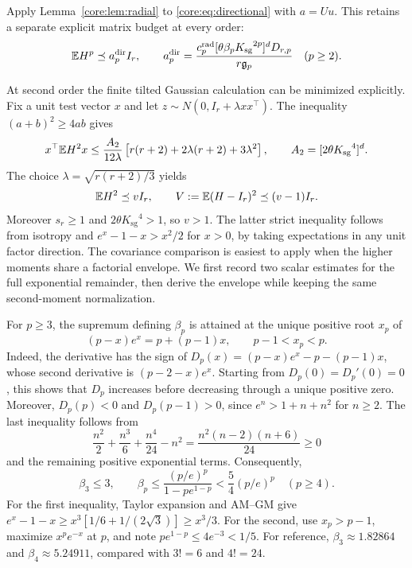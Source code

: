 \documentclass[11pt,a4paper]{article}
\theoremstyle{definition}\newtheorem{definition}[theorem]{Definition}
\theoremstyle{remark}\newtheorem{remark}[theorem]{Remark}
\numberwithin{equation}{section}
\newcommand{\Ksg}{{K_{\mathrm{sg}}}}\newcommand{\Cfour}{{C_4}}
\newcommand{\gmom}{\mathfrak g}
\begin{document}
Apply Lemma~\ref{core:lem:radial}
to \eqref{core:eq:directional} with $a=Uu$. This retains a separate
explicit matrix budget at every order:
\begin{equation}\label{core:eq:direct-budget}
 \E H^p\preceq a_p^{\mathrm{dir}}I_r,\qquad
 a_p^{\mathrm{dir}}=
 \frac{c_p^{\rm rad}[\theta\beta_p\Ksg^{2p}]^dD_{r,p}}{r\gmom_p}
 \quad(p\ge2).
\end{equation}

At second order the finite tilted Gaussian calculation can be minimized
explicitly. Fix a unit test vector $x$ and let
$z\sim N(0,I_r+\lambda xx^\top)$. The inequality
$(a+b)^2\ge4ab$ gives
\[
 x^\top\E H^2x
 \le\frac{A_2}{12\lambda}
   \left[r(r+2)+2\lambda(r+2)+3\lambda^2\right],
 \qquad A_2=[2\theta\Ksg^4]^d.
\]
The choice $\lambda=\sqrt{r(r+2)/3}$ yields
\[
 \mathbb E H^2\preceq vI_r,\qquad
 V:=\mathbb E(H-I_r)^2\preceq(v-1)I_r.
\]
Moreover $s_r\ge1$ and $2\theta\Ksg^4>1$, so $v>1$.
The latter strict inequality follows from isotropy and
$e^x-1-x>x^2/2$ for $x>0$, by taking expectations in any unit factor direction.
The covariance comparison is easiest to apply when the higher moments
share a factorial envelope. We first record two scalar estimates for
the full exponential remainder, then derive the envelope while keeping
the same second-moment normalization.

For $p\ge3$, the supremum defining $\beta_p$ is attained at the unique
positive root $x_p$ of
\[
 (p-x)e^x=p+(p-1)x,
 \qquad p-1<x_p<p.
\]
Indeed, the derivative has the sign of
$D_p(x)=(p-x)e^x-p-(p-1)x$, whose second derivative is
$(p-2-x)e^x$. Starting from $D_p(0)=D_p'(0)=0$, this shows that
$D_p$ increases before decreasing through a unique positive zero.
Moreover, $D_p(p)<0$ and $D_p(p-1)>0$, since
$e^n>1+n+n^2$ for $n\ge2$. The last inequality follows from
\[
 \frac{n^2}{2}+\frac{n^3}{6}+\frac{n^4}{24}-n^2
 =\frac{n^2(n-2)(n+6)}{24}\ge0
\]
and the remaining positive exponential terms.
Consequently,
\begin{equation}\label{core:eq:beta-estimates}
 \beta_3\le3,\qquad
 \beta_p\le\frac{(p/e)^p}{1-pe^{1-p}}
           <\frac54(p/e)^p\quad(p\ge4).
\end{equation}
For the first inequality, Taylor expansion and AM--GM give
$e^x-1-x\ge x^3[1/6+1/(2\sqrt3)]\ge x^3/3$.
For the second, use $x_p>p-1$, maximize $x^pe^{-x}$ at $p$, and
note $pe^{1-p}\le4e^{-3}<1/5$.
For reference, $\beta_3\approx1.82864$ and $\beta_4\approx5.24911$,
compared with $3!=6$ and $4!=24$.
\end{document}
